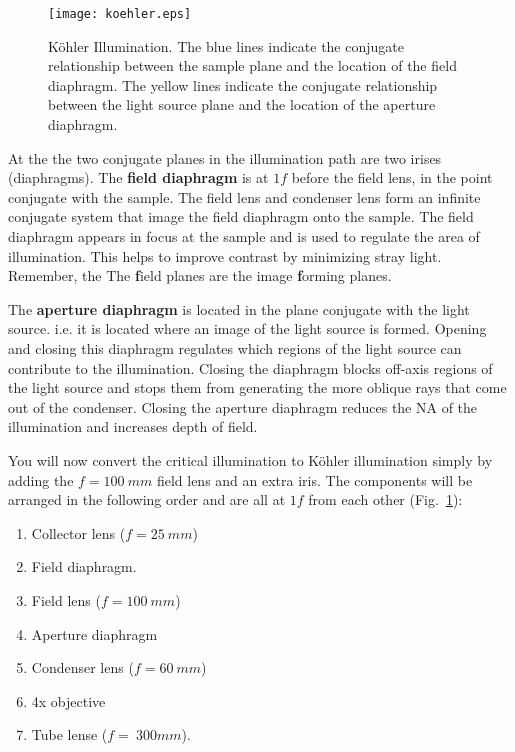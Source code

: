 \documentclass[a4paper]{report}
\begin{document}
\begin{figure}[ht]
\center
\texttt{[image: koehler.eps]}
\caption{K\"{o}hler Illumination. 
The blue lines indicate the conjugate relationship between the sample plane and the location of the field diaphragm.
The yellow lines indicate the conjugate relationship between the light source plane and the location of the aperture diaphragm.
}
\label{fig:koehler}
\end{figure}

At the the two conjugate planes in the illumination path are two irises (diaphragms). 
The \textbf{field diaphragm} is at $1f$ before the field lens, in the point conjugate with the sample. 
The field lens and condenser lens form an infinite conjugate system that image the field diaphragm onto the sample. 
The field diaphragm appears in focus at the sample and is used to regulate the area of illumination. 
This helps to improve contrast by minimizing stray light. 
Remember, the The \textbf{f}ield planes are the image \textbf{f}orming planes. 

The \textbf{aperture diaphragm} is located in the plane conjugate with the light source. 
i.e. it is located where an image of the light source is formed. 
Opening and closing this diaphragm regulates which regions of the light source can contribute to the illumination. 
Closing the diaphragm blocks off-axis regions of the light source and stops them from generating the more oblique rays that come out of the condenser. 
Closing the aperture diaphragm reduces the NA of the illumination and increases depth of field. 

\clearpage

You will now convert the critical illumination to K\"{o}hler illumination simply by adding the $f=100~mm$ field lens and an extra iris.
The components will be arranged in the following order and are all at $1f$ from each other (Fig.~\ref{fig:koehler}):
\begin{enumerate}
\setlength\itemsep{0.1em}
\item Collector lens ($f=25~mm$)
\item Field diaphragm.
\item Field lens ($f=100~mm$)
\item Aperture diaphragm
\item Condenser lens ($f=60~mm$)
\item 4x objective
\item Tube lense ($f=~300mm$).
\end{enumerate}
\end{document}
